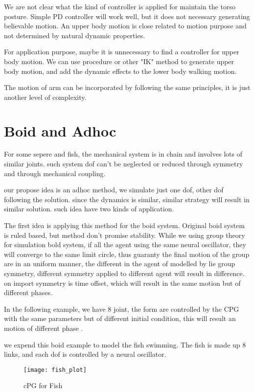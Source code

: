 We are not clear what the kind of controller is applied for maintain the torso posture.
Simple PD controller will work well, but it does not necessary generating believable motion.
An upper body motion is close related to motion purpose and not determined by natural dynamic properties.

For application purpose, maybe it is unnecessary to find a controller for upper body motion.
We can use procedure or other "IK" method to generate upper body motion, and add the dynamic effects to the lower body walking motion.

The motion of arm can be incorporated by following the same principles, it is just another level of complexity.


\section{Boid and Adhoc}

For some sepere and fish, the mechanical system is in chain and involves lots of similar joints.
such system dof can't be neglected or reduced through symmetry and through mechanical coupling.

our propose idea is an adhoc method, we simulate just one dof, other dof following the solution.
since the dynamics is similar, similar strategy will result in similar solution.
such idea have two kinds of application.


The first idea is applying this method for the boid system.
Original boid system is ruled based, but method don't promise stability.
While we using group theory for simulation bold system, if all the agent using the same neural oscillator, they will converge to the same limit circle,
thus guaranty the final motion of the group are in an uniform manner, the different in the agent of modelled by lie group symmetry, different symmetry applied to different agent will result in
difference.
on import symmetry is time offset, which will result in the same motion but of different phases.


In the following example, we have 8 joint,
the form are controlled by the CPG with the same parameters but of different initial condition,
this will result an motion of different phase .


we expend this boid example to model the fish swimming.
The fish is made up 8 links, and each dof is controlled by a neural oscillator.

\begin{figure}[!htbp]
  \begin{center}
      \texttt{[image: fish\_plot]}
    \caption{cPG for Fish}
    \label{fig:fishplot}
\end{center}
\end{figure}

